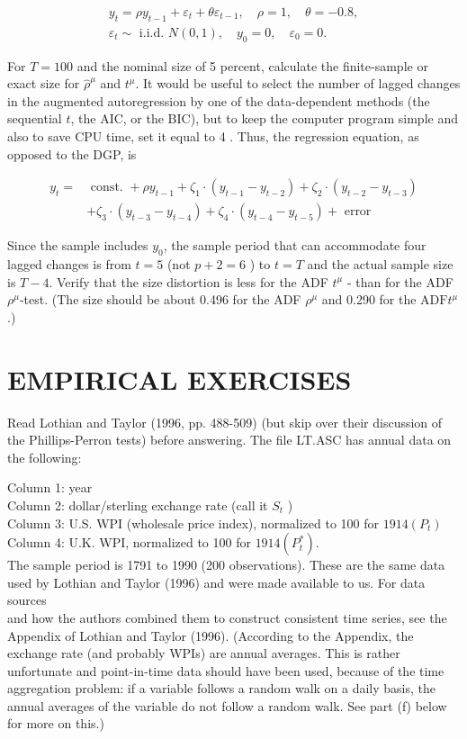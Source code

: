 \documentclass[10pt]{article}
\begin{document}
$$
\begin{gathered}
y_{t}=\rho y_{t-1}+\varepsilon_{t}+\theta \varepsilon_{t-1}, \quad \rho=1, \quad \theta=-0.8, \\
\varepsilon_{t} \sim \text { i.i.d. } N(0,1), \quad y_{0}=0, \quad \varepsilon_{0}=0 .
\end{gathered}
$$

For $T=100$ and the nominal size of 5 percent, calculate the finite-sample or exact size for $\hat{\rho}^{\mu}$ and $t^{\mu}$. It would be useful to select the number of lagged changes in the augmented autoregression by one of the data-dependent methods (the sequential $t$, the AIC, or the BIC), but to keep the computer program simple and also to save CPU time, set it equal to 4 . Thus, the regression equation, as opposed to the DGP, is

$$
\begin{aligned}
y_{t}= & \text { const. }+\rho y_{t-1}+\zeta_{1} \cdot\left(y_{t-1}-y_{t-2}\right)+\zeta_{2} \cdot\left(y_{t-2}-y_{t-3}\right) \\
& +\zeta_{3} \cdot\left(y_{t-3}-y_{t-4}\right)+\zeta_{4} \cdot\left(y_{t-4}-y_{t-5}\right)+\text { error }
\end{aligned}
$$

Since the sample includes $y_{0}$, the sample period that can accommodate four lagged changes is from $t=5$ (not $p+2=6$ ) to $t=T$ and the actual sample size is $T-4$. Verify that the size distortion is less for the ADF $t^{\mu}$ - than for the ADF $\rho^{\mu}$-test. (The size should be about 0.496 for the ADF $\rho^{\mu}$ and 0.290 for the $\mathrm{ADF} t^{\mu}$.)

\section*{EMPIRICAL EXERCISES}
Read Lothian and Taylor (1996, pp. 488-509) (but skip over their discussion of the Phillips-Perron tests) before answering. The file LT.ASC has annual data on the following:

Column 1: year\\
Column 2: dollar/sterling exchange rate (call it $S_{t}$ )\\
Column 3: U.S. WPI (wholesale price index), normalized to 100 for $1914\left(P_{t}\right)$\\
Column 4: U.K. WPI, normalized to 100 for $1914\left(P_{t}^{*}\right)$.\\
The sample period is 1791 to 1990 (200 observations). These are the same data used by Lothian and Taylor (1996) and were made available to us. For data sources\\
and how the authors combined them to construct consistent time series, see the Appendix of Lothian and Taylor (1996). (According to the Appendix, the exchange rate (and probably WPIs) are annual averages. This is rather unfortunate and point-in-time data should have been used, because of the time aggregation problem: if a variable follows a random walk on a daily basis, the annual averages of the variable do not follow a random walk. See part (f) below for more on this.)
\end{document}
